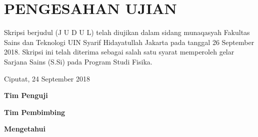 \chapter*{PENGESAHAN UJIAN}
Skripsi berjudul (J U D U L) telah diujikan dalam sidang munaqasyah Fakultas Sains dan Teknologi UIN Syarif Hidayatullah Jakarta pada tanggal 26 September 2018. Skripsi ini telah diterima sebagai salah satu syarat memperoleh gelar Sarjana Sains (S.Si) pada Program Studi Fisika.

\begin{flushright}
    Ciputat, 24 September 2018
\end{flushright}

\centerline{\textbf{Tim Penguji}}


\centerline{\textbf{Tim Pembimbing}}


\centerline{\textbf{Mengetahui}}

